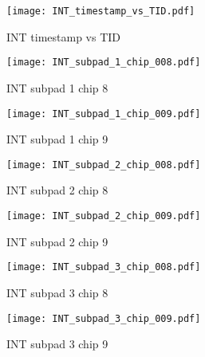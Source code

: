 \documentclass[a4paper,11pt]{article}
\begin{document}
\begin{figure}[htbp] \centering\texttt{[image: INT\_timestamp\_vs\_TID.pdf]}\caption{INT timestamp vs TID} \end{figure}
\begin{figure}[htbp] \centering\texttt{[image: INT\_subpad\_1\_chip\_008.pdf]}\caption{INT subpad 1 chip 8} \end{figure}
\begin{figure}[htbp] \centering\texttt{[image: INT\_subpad\_1\_chip\_009.pdf]}\caption{INT subpad 1 chip 9} \end{figure}
\begin{figure}[htbp] \centering\texttt{[image: INT\_subpad\_2\_chip\_008.pdf]}\caption{INT subpad 2 chip 8} \end{figure}
\begin{figure}[htbp] \centering\texttt{[image: INT\_subpad\_2\_chip\_009.pdf]}\caption{INT subpad 2 chip 9} \end{figure}


\begin{figure}[htbp] \centering\texttt{[image: INT\_subpad\_3\_chip\_008.pdf]}\caption{INT subpad 3 chip 8} \end{figure}
\begin{figure}[htbp] \centering\texttt{[image: INT\_subpad\_3\_chip\_009.pdf]}\caption{INT subpad 3 chip 9} \end{figure}
\end{document}
